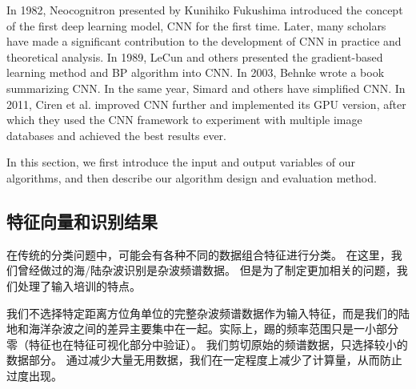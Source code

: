 In 1982, Neocognitron presented by Kunihiko Fukushima\cite{fukushima1982neocognitron} introduced the concept of the first deep learning model, CNN for the first time. Later, many scholars have made a significant contribution to the development of CNN in practice and theoretical analysis. In 1989, LeCun and others presented the gradient-based learning method\cite{lecun1998gradient} and BP algorithm\cite{lecun1989backpropagation} into CNN. In 2003, Behnke wrote a book summarizing CNN\cite{behnke2003hierarchical}. In the same year, Simard and others have simplified CNN\cite{simard2003best}. In 2011, Ciren et al. improved CNN further and implemented its GPU version\cite{ciresan2011flexible}, after which they used the CNN framework to experiment with multiple image databases and achieved the best results ever.

In this section, we first introduce the input and output variables of our algorithms, and then describe our algorithm design and evaluation method.
\subsection{特征向量和识别结果}
在传统的分类问题中，可能会有各种不同的数据组合特征进行分类。 在这里，我们曾经做过的海/陆杂波识别是杂波频谱数据。 但是为了制定更加相关的问题，我们处理了输入培训的特点。

我们不选择特定距离方位角单位的完整杂波频谱数据作为输入特征，而是我们的陆地和海洋杂波之间的差异主要集中在一起。实际上，踢的频率范围只是一小部分 零（特征也在特征可视化部分中验证）。 我们剪切原始的频谱数据，只选择较小的数据部分。 通过减少大量无用数据，我们在一定程度上减少了计算量，从而防止过度出现。

